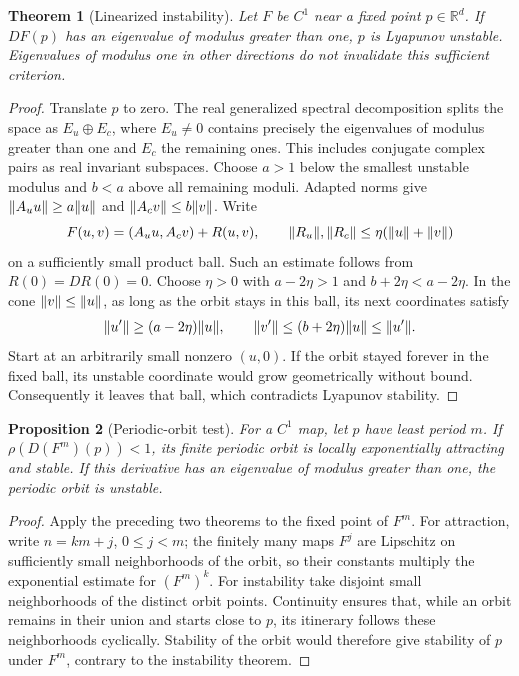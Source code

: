 \documentclass[11pt,oneside]{book}
\newtheorem{theorem}{Theorem}[chapter]
\newtheorem{proposition}[theorem]{Proposition}
\theoremstyle{definition}
\theoremstyle{remark}\newtheorem{remark}[theorem]{Remark}
\newcommand{\R}{\mathbb R}\newcommand{\C}{\mathbb C}
\begin{document}
\begin{theorem}[Linearized instability]\label{d13:15:linearized-instability}
Let \(F\) be \(C^1\) near a fixed point \(p\in\R^d\). If \(DF(p)\) has
an eigenvalue of modulus greater than one, \(p\) is Lyapunov unstable.
Eigenvalues of modulus one in other directions do not invalidate this
sufficient criterion.
\end{theorem}
\begin{proof}
Translate \(p\) to zero. The real generalized spectral decomposition
splits the space as \(E_u\oplus E_c\), where \(E_u\neq0\) contains precisely
the eigenvalues of modulus greater than one and \(E_c\) the remaining
ones. This includes conjugate complex pairs as real invariant subspaces.
Choose \(a>1\) below the smallest unstable modulus and \(b<a\) above all
remaining moduli. Adapted norms give
\(\lVert A_uu\rVert\geq a\lVert u\rVert\) and \(\lVert A_cv\rVert\leq b\lVert v\rVert\).
Write
\[
 F(u,v)=(A_uu,A_cv)+R(u,v),\qquad
 \lVert R_u\rVert,\lVert R_c\rVert\leq\eta(\lVert u\rVert+\lVert v\rVert)
\]
on a sufficiently small product ball. Such an estimate follows from
\(R(0)=DR(0)=0\). Choose \(\eta>0\) with
\(a-2\eta>1\) and \(b+2\eta<a-2\eta\).
In the cone \(\lVert v\rVert\leq\lVert u\rVert\), as long as the orbit stays in this
ball, its next coordinates satisfy
\[
 \lVert u'\rVert\geq(a-2\eta)\lVert u\rVert,\qquad
 \lVert v'\rVert\leq(b+2\eta)\lVert u\rVert\leq\lVert u'\rVert.
\]
Start at an arbitrarily small nonzero \((u,0)\). If the orbit stayed
forever in the fixed ball, its unstable coordinate would grow
geometrically without bound. Consequently it leaves that ball, which
contradicts Lyapunov stability.
\end{proof}

\begin{proposition}[Periodic-orbit test]\label{d13:15:periodic-multipliers}
For a \(C^1\) map, let \(p\) have least period \(m\). If
\(\rho(D(F^m)(p))<1\), its finite periodic orbit is locally exponentially
attracting and stable. If this derivative has an eigenvalue of modulus
greater than one, the periodic orbit is unstable.
\end{proposition}
\begin{proof}
Apply the preceding two theorems to the fixed point of \(F^m\).
For attraction, write \(n=km+j\), \(0\leq j<m\); the finitely many maps
\(F^j\) are Lipschitz on sufficiently small neighborhoods of the orbit,
so their constants multiply the exponential estimate for \((F^m)^k\).
For instability take disjoint small neighborhoods of the distinct orbit
points. Continuity ensures that, while an orbit remains in their union
and starts close to \(p\), its itinerary follows these neighborhoods
cyclically. Stability of the orbit would therefore give stability of
\(p\) under \(F^m\), contrary to the instability theorem.
\end{proof}
\end{document}
